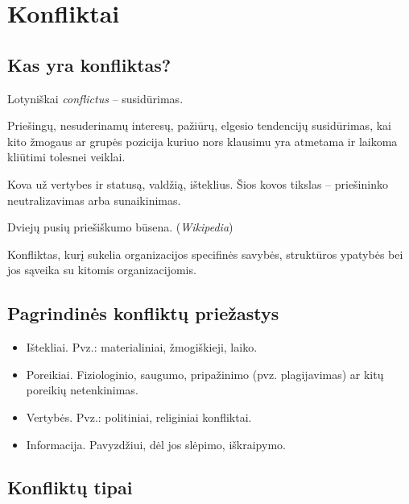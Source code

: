 \chapter{Konfliktai}

\section{Kas yra konfliktas?}

Lotyniškai \emph{conflictus} – susidūrimas.

\begin{defn}[Konfliktas]
  Priešingų, nesuderinamų interesų, pažiūrų, elgesio tendencijų
  susidūrimas, kai kito žmogaus ar grupės pozicija kuriuo nors
  klausimu yra atmetama ir laikoma kliūtimi tolesnei veiklai.
\end{defn}


\begin{defn}[Konfliktas]
  Kova už vertybes ir statusą, valdžią, išteklius. Šios kovos tikslas
  – priešininko neutralizavimas arba sunaikinimas.
\end{defn}

\begin{defn}[Konfliktas]
  Dviejų pusių priešiškumo būsena. (\emph{Wikipedia})
\end{defn}

\begin{defn}
  Konfliktas, kurį sukelia organizacijos specifinės savybės,
  struktūros ypatybės bei jos sąveika su kitomis organizacijomis.
\end{defn}

\section{Pagrindinės konfliktų priežastys}

\begin{itemize}
  \item Ištekliai. Pvz.: materialiniai, žmogiškieji, laiko.
  \item Poreikiai. Fiziologinio, saugumo, pripažinimo (pvz. plagijavimas) ar
    kitų poreikių netenkinimas.
  \item Vertybės. Pvz.: politiniai, religiniai konfliktai.
  \item Informacija. Pavyzdžiui, dėl jos slėpimo, iškraipymo.
\end{itemize}

\section{Konfliktų tipai}

